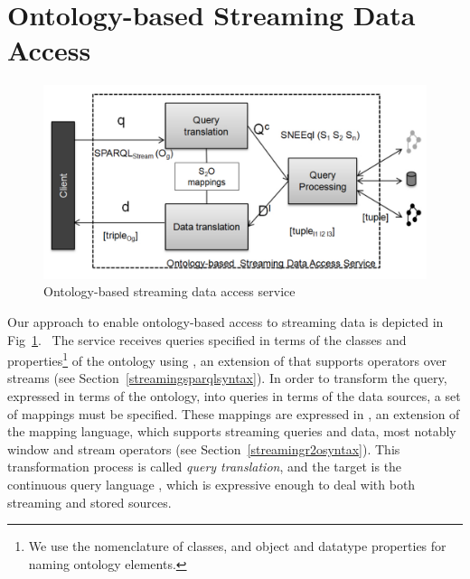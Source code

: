 \section{Ontology-based Streaming Data Access}
\label{approach}



\begin{figure}[t]
  \centering
  \includegraphics[width=.8\textwidth]{img/approachImg}
  \caption{Ontology-based streaming data access service}
  \label{fig:SemanticIntegrator}
\end{figure}

Our approach to enable ontology-based access to streaming data is depicted in Fig~\ref{fig:SemanticIntegrator}.\ %
The service receives queries specified in terms of the classes and properties\footnote{We use the \owl nomenclature of classes, and object and datatype properties for naming ontology elements.} of the ontology using \sparqlstr, an extension of \sparql that supports operators over \rdf streams (see Section~\ref{streamingsparqlsyntax}).
In order to transform the \sparqlstr query, expressed in terms of the ontology, into queries in terms of the data sources, a set of mappings must be specified.
These mappings are expressed in \stwoo, an extension of the \rtwoo mapping language, which supports streaming queries and data, most notably window and stream operators (see Section~\ref{streamingr2osyntax}).
This transformation process is called \textit{query translation}, and the target is the continuous query language \sneeql, which is expressive enough to deal with both streaming and stored sources.

